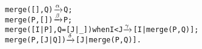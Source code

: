 \begin{alltt}
merge(   [],      Q)            \(\smashedrightarrow{\alpha}\) Q;
merge(    P,     [])            \(\smashedrightarrow{\beta}\) P;
merge([I|P],Q=[J|_]) when I < J \(\smashedrightarrow{\gamma}\) [I|merge(P,Q)];
merge(    P,  [J|Q])            \(\smashedrightarrow{\delta}\) [J|merge(P,Q)].
\end{alltt}
